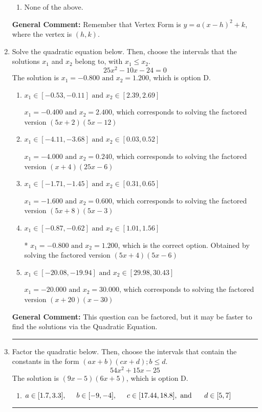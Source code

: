 \documentclass{extbook}[14pt]
\newcommand{\litem}[1]{\item #1

\rule{\textwidth}{0.4pt}}
\begin{document}
\begin{enumerate}
{\begin{enumerate}[label=\Alph*.]
\begin{multicols}{2}
\end{multicols}\item None of the above.\end{enumerate}
\textbf{General Comment:} Remember that Vertex Form is $y = a(x-h)^2+k$, where the vertex is $(h, k)$.
}
\litem{
Solve the quadratic equation below. Then, choose the intervals that the solutions $x_1$ and $x_2$ belong to, with $x_1 \leq x_2$.
\[ 25x^{2} -10 x -24 = 0 \]The solution is \( x_1 = -0.800 \text{ and } x_2 = 1.200 \), which is option D.\begin{enumerate}[label=\Alph*.]
\item \( x_1 \in [-0.53, -0.11] \text{ and } x_2 \in [2.39, 2.69] \)

$x_1 = -0.400 \text{ and } x_2 = 2.400$, which corresponds to solving the factored version $(5x + 2)(5x -12)$
\item \( x_1 \in [-4.11, -3.68] \text{ and } x_2 \in [0.03, 0.52] \)

$x_1 = -4.000 \text{ and } x_2 = 0.240$, which corresponds to solving the factored version $(x + 4)(25x -6)$
\item \( x_1 \in [-1.71, -1.45] \text{ and } x_2 \in [0.31, 0.65] \)

$x_1 = -1.600 \text{ and } x_2 = 0.600$, which corresponds to solving the factored version $(5x + 8)(5x -3)$
\item \( x_1 \in [-0.87, -0.62] \text{ and } x_2 \in [1.01, 1.56] \)

* $x_1 = -0.800 \text{ and } x_2 = 1.200$, which is the correct option. Obtained by solving the factored version $(5x + 4)(5x -6)$
\item \( x_1 \in [-20.08, -19.94] \text{ and } x_2 \in [29.98, 30.43] \)

$x_1 = -20.000 \text{ and } x_2 = 30.000$, which corresponds to solving the factored version $(x + 20)(x -30)$
\end{enumerate}

\textbf{General Comment:} This question can be factored, but it may be faster to find the solutions via the Quadratic Equation.
}
\litem{
Factor the quadratic below. Then, choose the intervals that contain the constants in the form $(ax+b)(cx+d); b \leq d.$
\[ 54x^{2} +15 x -25 \]The solution is \( (9x -5)(6x + 5) \), which is option D.\begin{enumerate}[label=\Alph*.]
\item \( a \in [1.7, 3.3], \hspace*{5mm} b \in [-9, -4], \hspace*{5mm} c \in [17.44, 18.8], \text{ and } \hspace*{5mm} d \in [5, 7] \)


\end{enumerate}}
\end{enumerate}
\end{document}
